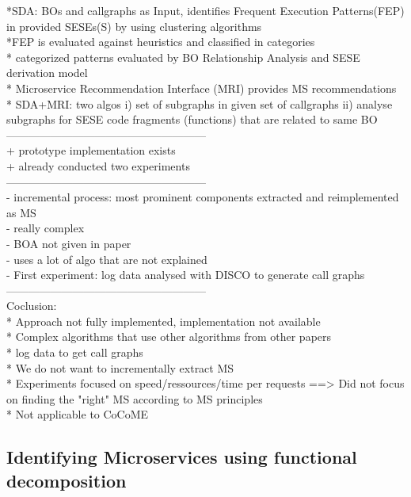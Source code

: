 *SDA: BOs and callgraphs as Input, identifies Frequent Execution Patterns(FEP) in provided SESEs(S)  by using clustering algorithms\\
*FEP is evaluated against heuristics and classified in categories \\
* categorized patterns evaluated by BO Relationship Analysis and SESE derivation model  \\
* Microservice Recommendation Interface (MRI) provides MS recommendations \\
* SDA+MRI: two algos i) set of subgraphs in given set of callgraphs ii) analyse subgraphs for SESE code fragments (functions) that are related to same BO \\



------------------------------------------------------\\
+ prototype implementation exists\\
+ already conducted two experiments \\


------------------------------------------------------\\
- incremental process: most prominent components extracted and reimplemented as MS\\
- really complex\\
- BOA not given in paper\\
- uses a lot of algo that are not explained\\
- First experiment: log data analysed with DISCO to generate call graphs\\

------------------------------------------------------\\
Coclusion: \\
* Approach not fully implemented, implementation not available\\
* Complex algorithms  that use other algorithms from other papers\\
* log data to get call graphs\\
* We do not want to incrementally extract MS\\
* Experiments focused on speed/ressources/time per requests ==> Did not focus on finding the "right" MS according to MS principles\\
* Not applicable to CoCoME\\

\subsection{Identifying Microservices using functional decomposition}

